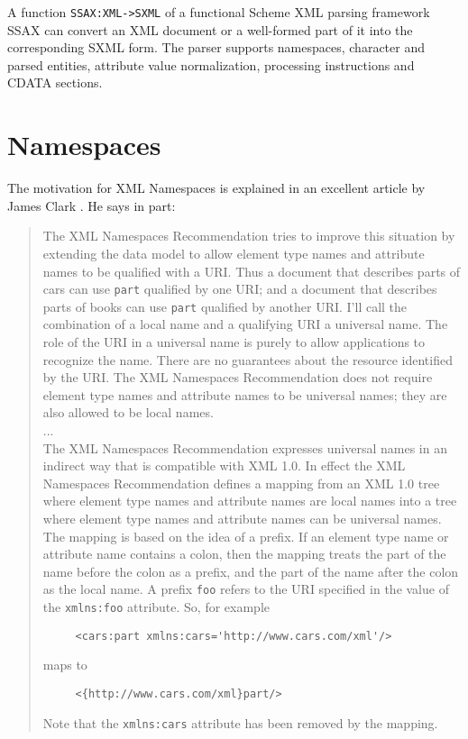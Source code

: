 \documentclass[10pt]{article}
\begin{document}
A function \texttt{SSAX:XML->SXML} of a functional Scheme XML parsing
framework SSAX \cite{SSAX} can convert an XML document or a
well-formed part of it into the corresponding SXML form. The parser
supports namespaces, character and parsed entities, 
attribute value normalization, processing instructions and CDATA
sections.

\section{Namespaces}
The motivation for XML Namespaces is explained in an excellent article by James Clark \cite{Clark1999}. He says in part: 

\begin{quote}
The XML Namespaces Recommendation tries to improve this
situation by extending the data model to allow element type names and
attribute names to be qualified with a URI. Thus a document that
describes parts of cars can use \texttt{part} qualified by one URI; and a
document that describes parts of books can use \texttt{part} qualified by
another URI. I'll call the combination of a local name and a
qualifying URI a universal name. The role of the URI in a universal
name is purely to allow applications to recognize the name. There are
no guarantees about the resource identified by the URI. The XML
Namespaces Recommendation does not require element type names and
attribute names to be universal names; they are also allowed to be
local names.\\ ...\\ The XML Namespaces Recommendation expresses universal names in an
indirect way that is compatible with XML 1.0. In effect the XML
Namespaces Recommendation defines a mapping from an XML 1.0 tree where
element type names and attribute names are local names into a tree
where element type names and attribute names can be universal
names. The mapping is based on the idea of a prefix. If an element
type name or attribute name contains a colon, then the mapping treats
the part of the name before the colon as a prefix, and the part of the
name after the colon as the local name. A prefix \texttt{foo}
refers to the URI specified in the value of the \texttt{xmlns:foo}
attribute. So, for example\begin{verbatim}
     <cars:part xmlns:cars='http://www.cars.com/xml'/>
\end{verbatim}
maps to\begin{verbatim}
     <{http://www.cars.com/xml}part/>
\end{verbatim}
Note that the \texttt{xmlns:cars} attribute has been removed by the mapping.\end{quote}
\end{document}
